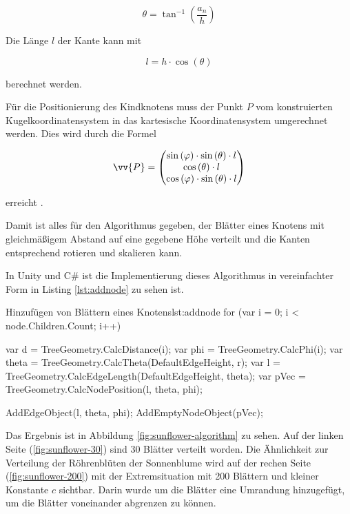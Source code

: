\begin{equation}
  \theta = \tan^{-1} \left(\frac{a_n}{h}\right)
\end{equation}

Die Länge $l$ der Kante kann mit

\begin{equation}
  l = h \cdot \cos\left(\theta\right)
\end{equation}

berechnet werden.

Für die Positionierung des Kindknotens muss der Punkt $P$ vom konstruierten Kugelkoordinatensystem in das kartesische Koordinatensystem umgerechnet werden. Dies wird durch die Formel

\begin{equation}
  \vv{P} =
  \begin{pmatrix}
    \sin\left(\varphi\right) \cdot \sin\left(\theta\right) \cdot l\\
    \cos\left(\theta\right) \cdot l\\
    \cos\left(\varphi\right) \cdot \sin\left(\theta\right) \cdot l
  \end{pmatrix}
\end{equation}

erreicht \cite{wolfram2017spherical}.

Damit ist alles für den Algorithmus gegeben, der Blätter eines Knotens mit gleichmäßigem Abstand auf eine gegebene Höhe verteilt und die Kanten entsprechend rotieren und skalieren kann.

In Unity und C\# ist die Implementierung dieses Algorithmus in vereinfachter Form in Listing \ref{lst:addnode} zu sehen ist.

\begin{codesnippet}{Hinzufügen von Blättern eines Knotens}{lst:addnode}
for (var i = 0; i < node.Children.Count; i++)
{
    var d = TreeGeometry.CalcDistance(i);
    var phi = TreeGeometry.CalcPhi(i);
    var theta = TreeGeometry.CalcTheta(DefaultEdgeHeight, r);
    var l = TreeGeometry.CalcEdgeLength(DefaultEdgeHeight, theta);
    var pVec = TreeGeometry.CalcNodePosition(l, theta, phi);

    AddEdgeObject(l, theta, phi);
    AddEmptyNodeObject(pVec);
}
\end{codesnippet}

Das Ergebnis ist in Abbildung \ref{fig:sunflower-algorithm} zu sehen. Auf der linken Seite (\ref{fig:sunflower-30}) sind 30 Blätter verteilt worden. Die Ähnlichkeit zur Verteilung der Röhrenblüten der Sonnenblume wird auf der rechen Seite (\ref{fig:sunflower-200}) mit der Extremsituation mit 200 Blättern und kleiner Konstante $c$ sichtbar. Darin wurde um die Blätter eine Umrandung hinzugefügt, um die Blätter voneinander abgrenzen zu können.

